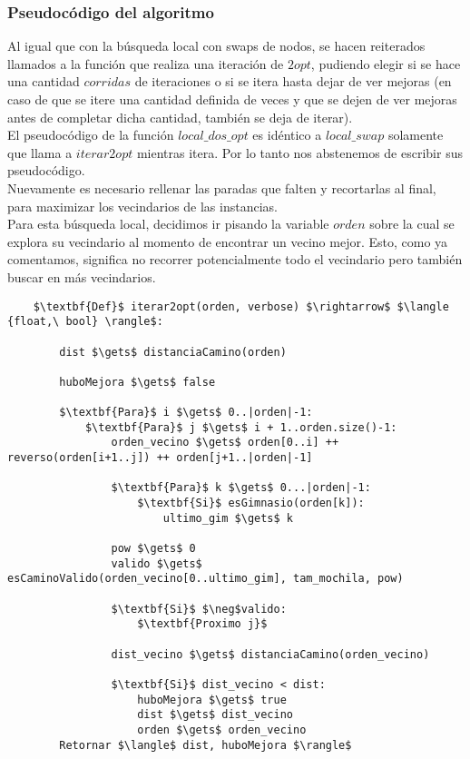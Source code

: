     \newpage
    \subsubsection{Pseudocódigo del algoritmo}

    Al igual que con la búsqueda local con swaps de nodos, se hacen reiterados llamados a la función que realiza una iteración de $2opt$, pudiendo elegir si se hace una cantidad $corridas$ de iteraciones o si se itera hasta dejar de ver mejoras (en caso de que se itere una cantidad definida de veces y que se dejen de ver mejoras antes de completar dicha cantidad, también se deja de iterar).
    \\

    El pseudocódigo de la función $local\_dos\_opt$ es idéntico a $local\_swap$ solamente que llama a $iterar2opt$ mientras itera. Por lo tanto nos abstenemos de escribir sus pseudocódigo.
    \\

    Nuevamente es necesario rellenar las paradas que falten y recortarlas al final, para maximizar los vecindarios de las instancias.
    \\

    Para esta búsqueda local, decidimos ir pisando la variable $orden$ sobre la cual se explora su vecindario al momento de encontrar un vecino mejor. Esto, como ya comentamos, significa no recorrer potencialmente todo el vecindario pero también buscar en más vecindarios.

    \begin{lstlisting}
    $\textbf{Def}$ iterar2opt(orden, verbose) $\rightarrow$ $\langle {float,\ bool} \rangle$:

        dist $\gets$ distanciaCamino(orden)

        huboMejora $\gets$ false

        $\textbf{Para}$ i $\gets$ 0..|orden|-1:
            $\textbf{Para}$ j $\gets$ i + 1..orden.size()-1:
                orden_vecino $\gets$ orden[0..i] ++ reverso(orden[i+1..j]) ++ orden[j+1..|orden|-1]

                $\textbf{Para}$ k $\gets$ 0...|orden|-1:
                    $\textbf{Si}$ esGimnasio(orden[k]):
                        ultimo_gim $\gets$ k

                pow $\gets$ 0
                valido $\gets$ esCaminoValido(orden_vecino[0..ultimo_gim], tam_mochila, pow)

                $\textbf{Si}$ $\neg$valido:
                    $\textbf{Proximo j}$

                dist_vecino $\gets$ distanciaCamino(orden_vecino)

                $\textbf{Si}$ dist_vecino < dist:
                    huboMejora $\gets$ true
                    dist $\gets$ dist_vecino
                    orden $\gets$ orden_vecino
        Retornar $\langle$ dist, huboMejora $\rangle$
    \end{lstlisting}

